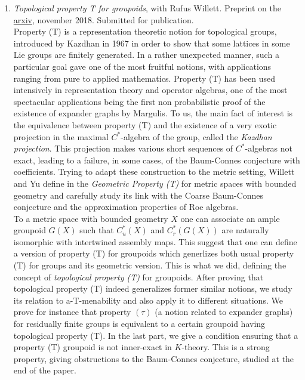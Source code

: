\documentclass[a4paper]{article}
\begin{document}
\begin{enumerate}
\item \textit{Topological property T for groupoids}, with Rufus Willett. Preprint on the \href{https://arxiv.org/abs/1811.07085}{arxiv}, november 2018. Submitted for publication.\\

Property (T) is a representation theoretic notion for topological groups, introduced by Kazdhan \cite{kazhdan} in 1967 in order to show that some lattices in some Lie groups are finitely generated. In a rather unexpected manner, such a particular goal gave one of the most fruitful notions, with applications ranging from pure to applied mathematics. Property (T) has been used intensively in representation theory and operator algebras, one of the most spectacular applications being the first non probabilistic proof of the existence of expander graphs by Margulis. To us, the main fact of interest is the equivalence between property (T) and the existence of a  very exotic projection in the maximal $C^*$-algebra of the group, called the \textit{Kazdhan projection}. This projection makes various short sequences of $C^*$-algebras not exact, leading to a failure, in some cases, of the Baum-Connes conjecture with coefficients. Trying to adapt these construction to the metric setting, Willett and Yu define in \cite{WillettYu} the \textit{Geometric Property (T)} for metric spaces with bounded geometry and carefully study its link with the Coarse Baum-Connes conjecture and the approximation properties of Roe algebras.\\

To a metric space with bounded geometry $X$ one can associate an ample groupoid $G(X)$ such that  $C^*_u(X)$ and $C_r^*(G(X))$ are naturally isomorphic with intertwined assembly maps. This suggest that one can define a version of property (T) for groupoids which generlizes both usual property (T) for groups and its geometric version. This is what we did, defining the concept of \textit{topological property (T)} for groupoids. After proving that topological property (T) indeed generalizes former similar notions, we study its relation to a-T-menability and also apply it to different situations. We prove for instance that property $(\tau)$ (a notion related to expander graphs) for residually finite groups is equivalent to a certain groupoid having topological property (T). In the last part, we give a condition ensuring that a property (T) groupoid is not inner-exact in $K$-theory. This is a strong property, giving obstructions to the Baum-Connes conjecture, studied at the end of the paper.


\end{enumerate}
\end{document}

